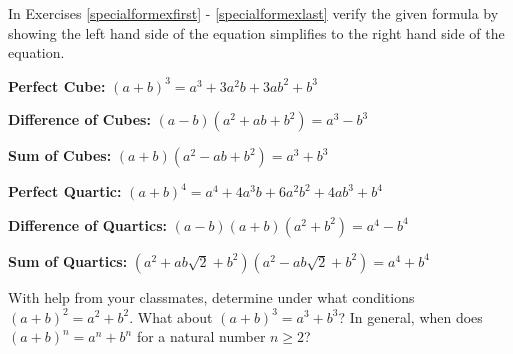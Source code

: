 \documentclass{ximera}
\begin{document}
\begin{question}
In Exercises \ref{specialformexfirst} - \ref{specialformexlast} verify the given formula by showing the left hand side of the equation simplifies to the right hand side of the equation.

\begin{problem}\label{specialformexfirst}
\textbf{Perfect Cube:} $(a+b)^3 = a^3 + 3a^2b + 3ab^2 + b^3$
\end{problem}

\begin{problem}
\textbf{Difference of Cubes:} $(a - b)(a^2 + ab + b^2) = a^3 - b^3$
\end{problem}

\begin{problem}
\textbf{Sum of Cubes:} $(a + b)(a^2 - ab + b^2) = a^3 + b^3$
\end{problem}

\begin{problem}
\textbf{Perfect Quartic:} $(a+b)^4 = a^4 + 4a^3b + 6a^2b^2 + 4ab^3 + b^4$
\end{problem}

\begin{problem}
\textbf{Difference of Quartics:} $(a-b)(a+b)(a^2+b^2) = a^4 - b^4$  
\end{problem}

\begin{problem}\label{specialformexlast}
\textbf{Sum of Quartics:}  $(a^2 + ab \sqrt{2} + b^2)(a^2 - ab \sqrt{2} + b^2) = a^4 + b^4$
\end{problem}
 

\end{question}

\begin{problem}
With help from your classmates, determine under what conditions $(a+b)^2 = a^2 + b^2$.  What about $(a+b)^3 = a^3 + b^3$? In general, when does $(a+b)^n = a^n + b^n$ for a natural number $n \geq 2$?
\end{problem}
\end{document}

